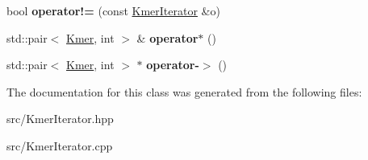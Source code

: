 \begin{DoxyCompactItemize}
\mbox{\label{classKmerIterator_a70da0f8aa765d31759c2a66dfb09a3b1}} 
bool {\bfseries operator!=} (const \hyperlink{classKmerIterator}{Kmer\+Iterator} \&o)
\item 
\mbox{\label{classKmerIterator_a64551434e2e7ef67027b9e69fc83f4d5}} 
std\+::pair$<$ \hyperlink{classKmer}{Kmer}, int $>$ \& {\bfseries operator$\ast$} ()
\item 
\mbox{\label{classKmerIterator_a83882617fb0595ad2696f00d9a3eab36}} 
std\+::pair$<$ \hyperlink{classKmer}{Kmer}, int $>$ $\ast$ {\bfseries operator-\/$>$} ()
\end{DoxyCompactItemize}


The documentation for this class was generated from the following files\+:\begin{DoxyCompactItemize}
\item 
src/Kmer\+Iterator.\+hpp\item 
src/Kmer\+Iterator.\+cpp\end{DoxyCompactItemize}
